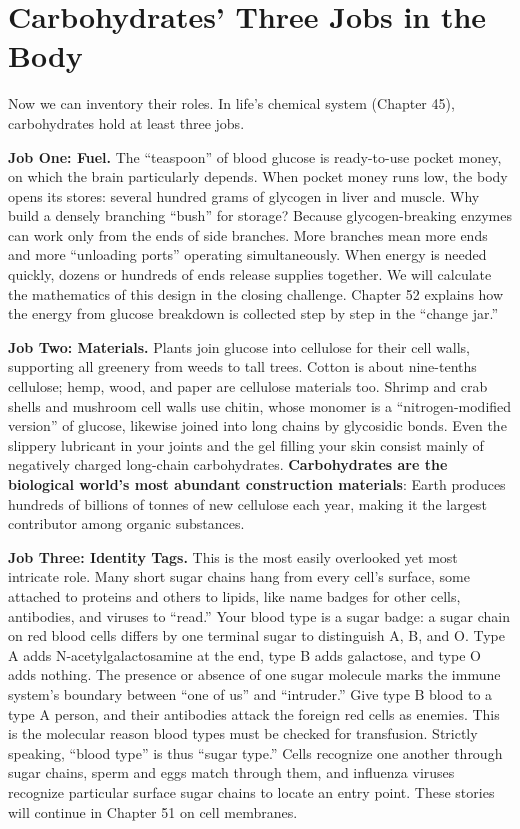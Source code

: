 \section{Carbohydrates' Three Jobs in the Body}

Now we can inventory their roles. In life's chemical system (Chapter 45), carbohydrates hold at least three jobs.

\textbf{Job One: Fuel.} The ``teaspoon'' of blood glucose is ready-to-use pocket money, on which the brain particularly depends. When pocket money runs low, the body opens its stores: several hundred grams of glycogen in liver and muscle. Why build a densely branching ``bush'' for storage? Because glycogen-breaking enzymes can work only from the ends of side branches. More branches mean more ends and more ``unloading ports'' operating simultaneously. When energy is needed quickly, dozens or hundreds of ends release supplies together. We will calculate the mathematics of this design in the closing challenge. Chapter 52 explains how the energy from glucose breakdown is collected step by step in the ``change jar.''

\textbf{Job Two: Materials.} Plants join glucose into cellulose for their cell walls, supporting all greenery from weeds to tall trees. Cotton is about nine-tenths cellulose; hemp, wood, and paper are cellulose materials too. Shrimp and crab shells and mushroom cell walls use chitin, whose monomer is a ``nitrogen-modified version'' of glucose, likewise joined into long chains by glycosidic bonds. Even the slippery lubricant in your joints and the gel filling your skin consist mainly of negatively charged long-chain carbohydrates. \textbf{Carbohydrates are the biological world's most abundant construction materials}: Earth produces hundreds of billions of tonnes of new cellulose each year, making it the largest contributor among organic substances.

\textbf{Job Three: Identity Tags.} This is the most easily overlooked yet most intricate role. Many short sugar chains hang from every cell's surface, some attached to proteins and others to lipids, like name badges for other cells, antibodies, and viruses to ``read.'' Your blood type is a sugar badge: a sugar chain on red blood cells differs by one terminal sugar to distinguish A, B, and O. Type A adds N-acetylgalactosamine at the end, type B adds galactose, and type O adds nothing. The presence or absence of one sugar molecule marks the immune system's boundary between ``one of us'' and ``intruder.'' Give type B blood to a type A person, and their antibodies attack the foreign red cells as enemies. This is the molecular reason blood types must be checked for transfusion. Strictly speaking, ``blood type'' is thus ``sugar type.'' Cells recognize one another through sugar chains, sperm and eggs match through them, and influenza viruses recognize particular surface sugar chains to locate an entry point. These stories will continue in Chapter 51 on cell membranes.

